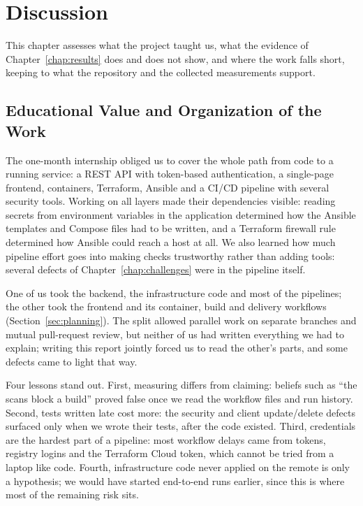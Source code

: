 \chapter{Discussion}
\label{chap:discussion}

This chapter assesses what the project taught us, what the evidence of Chapter~\ref{chap:results} does and does not show, and where the work falls short, keeping to what the repository and the collected measurements support.

\section{Educational Value and Organization of the Work}

The one-month internship obliged us to cover the whole path from code to a running service: a REST API with token-based authentication, a single-page frontend, containers, Terraform, Ansible and a CI/CD pipeline with several security tools. Working on all layers made their dependencies visible: reading secrets from environment variables in the application determined how the Ansible templates and Compose files had to be written, and a Terraform firewall rule determined how Ansible could reach a host at all. We also learned how much pipeline effort goes into making checks trustworthy rather than adding tools: several defects of Chapter~\ref{chap:challenges} were in the pipeline itself.

One of us took the backend, the infrastructure code and most of the pipelines; the other took the frontend and its container, build and delivery workflows (Section~\ref{sec:planning}). The split allowed parallel work on separate branches and mutual pull-request review, but neither of us had written everything we had to explain; writing this report jointly forced us to read the other's parts, and some defects came to light that way.

Four lessons stand out. First, measuring differs from claiming: beliefs such as ``the scans block a build'' proved false once we read the workflow files and run history. Second, tests written late cost more: the security and client update/delete defects surfaced only when we wrote their tests, after the code existed. Third, credentials are the hardest part of a pipeline: most workflow delays came from tokens, registry logins and the Terraform Cloud token, which cannot be tried from a laptop like code. Fourth, infrastructure code never applied on the remote is only a hypothesis; we would have started end-to-end runs earlier, since this is where most of the remaining risk sits.

